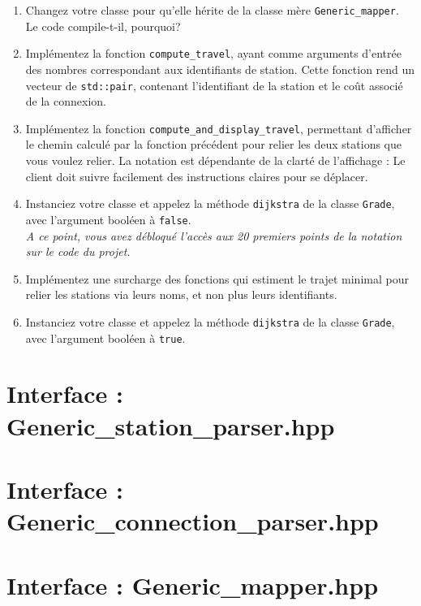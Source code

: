 \documentclass[9pts]{article}
\begin{document}
\begin{enumerate}
\item Changez votre classe pour qu'elle hérite de la classe mère \texttt{Generic\_mapper}.\\
Le code compile-t-il, pourquoi?
\item Implémentez la fonction \texttt{compute\_travel}, ayant comme arguments d'entrée des nombres correspondant aux identifiants de station. Cette fonction rend un vecteur de \texttt{std::pair}, contenant l'identifiant de la station et le coût associé de la connexion.

\item Implémentez la fonction \texttt{compute\_and\_display\_travel}, permettant d'afficher le chemin calculé par la fonction précédent pour relier les deux stations que vous voulez relier. La notation est dépendante de la clarté de l'affichage : Le client doit suivre facilement des instructions claires pour se déplacer.
\item Instanciez votre classe et appelez la méthode \texttt{dijkstra} de la classe \texttt{Grade}, avec l'argument booléen à \texttt{false}.\\

\emph{A ce point, vous avez débloqué l'accès aux 20 premiers points de la notation sur le code du projet.}\\

\item Implémentez une surcharge des fonctions qui estiment le trajet minimal pour relier les stations via leurs noms, et non plus leurs identifiants.
\item Instanciez votre classe et appelez la méthode \texttt{dijkstra} de la classe \texttt{Grade}, avec l'argument booléen à \texttt{true}.
\end{enumerate}

\appendix
\clearpage


\section{Interface : Generic\_station\_parser.hpp}

\section{Interface : Generic\_connection\_parser.hpp}

\section{Interface : Generic\_mapper.hpp}

\end{document}
